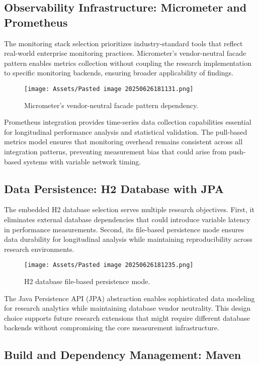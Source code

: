 \subsection{Observability Infrastructure: Micrometer and Prometheus}

The monitoring stack selection prioritizes industry-standard tools that reflect real-world enterprise monitoring practices. Micrometer's vendor-neutral facade pattern enables metrics collection without coupling the research implementation to specific monitoring backends, ensuring broader applicability of findings.

\begin{figure}[H]
    \centering
    \texttt{[image: Assets/Pasted image 20250626181131.png]}
    \caption{Micrometer's vendor-neutral facade pattern dependency. \cite{Micrometer}}
\end{figure}
Prometheus integration provides time-series data collection capabilities essential for longitudinal performance analysis and statistical validation. The pull-based metrics model ensures that monitoring overhead remains consistent across all integration patterns, preventing measurement bias that could arise from push-based systems with variable network timing.

\subsection{Data Persistence: H2 Database with JPA}

The embedded H2 database selection serves multiple research objectives. First, it eliminates external database dependencies that could introduce variable latency in performance measurements. Second, its file-based persistence mode ensures data durability for longitudinal analysis while maintaining reproducibility across research environments.

\begin{figure}[H]
    \centering
    \texttt{[image: Assets/Pasted image 20250626181235.png]}
    \caption{H2 database file-based persistence mode. \cite{SpringBootJPA}}
\end{figure}
The Java Persistence API (JPA) abstraction enables sophisticated data modeling for research analytics while maintaining database vendor neutrality. This design choice supports future research extensions that might require different database backends without compromising the core measurement infrastructure.

\subsection{Build and Dependency Management: Maven}

